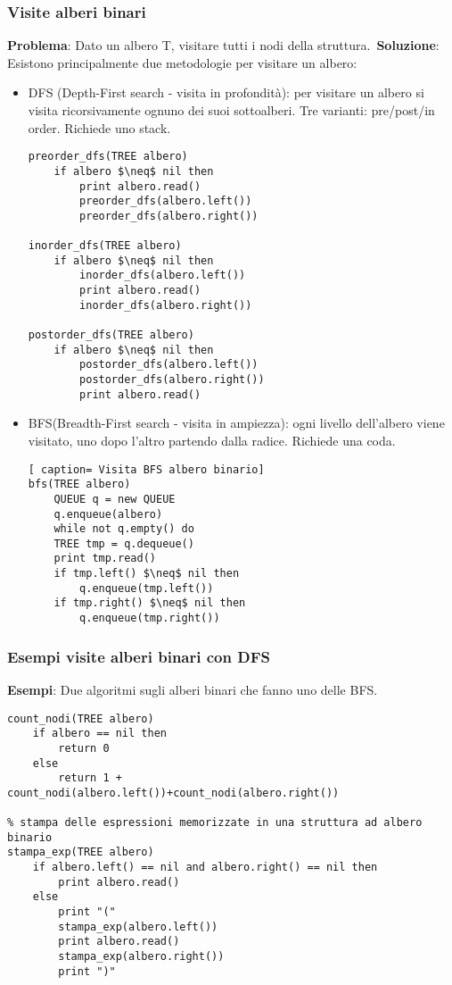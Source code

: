 \documentclass[../cheatSheetAlgoritmi.tex]{subfiles}
\begin{document}
\subsubsection{Visite alberi binari}
\textbf{Problema}: Dato un albero T, visitare tutti i nodi della struttura.\
\textbf{Soluzione}: Esistono principalmente due metodologie per visitare un albero:\
\begin{itemize}
	\item DFS (Depth-First search - visita in profondità): per visitare un albero si visita ricorsivamente ognuno dei suoi sottoalberi. Tre varianti: pre/post/in order. Richiede uno stack.
\begin{lstlisting}[caption= Visita DFS albero binario]
preorder_dfs(TREE albero)
	if albero $\neq$ nil then
		print albero.read()
		preorder_dfs(albero.left())
		preorder_dfs(albero.right())

inorder_dfs(TREE albero)
	if albero $\neq$ nil then
		inorder_dfs(albero.left())
		print albero.read()
		inorder_dfs(albero.right())

postorder_dfs(TREE albero)
	if albero $\neq$ nil then
		postorder_dfs(albero.left())
		postorder_dfs(albero.right())
		print albero.read()
\end{lstlisting}
 	\item BFS(Breadth-First search - visita in ampiezza): ogni livello dell'albero viene visitato, uno dopo l'altro partendo dalla radice. Richiede una coda. 
\begin{lstlisting}[ caption= Visita BFS albero binario]
bfs(TREE albero)
	QUEUE q = new QUEUE
	q.enqueue(albero)
	while not q.empty() do
	TREE tmp = q.dequeue()
	print tmp.read()
	if tmp.left() $\neq$ nil then
		q.enqueue(tmp.left())
	if tmp.right() $\neq$ nil then
		q.enqueue(tmp.right())
\end{lstlisting}
\end{itemize}
\newpage

\subsubsection{Esempi visite alberi binari con DFS}
\textbf{Esempi}: Due algoritmi sugli alberi binari che fanno uno delle BFS.
\begin{lstlisting}[caption= Esempi DFS alberi binari]
% conta i nodi di un albero binario
count_nodi(TREE albero)
	if albero == nil then
		return 0
	else 
		return 1 + count_nodi(albero.left())+count_nodi(albero.right())

% stampa delle espressioni memorizzate in una struttura ad albero binario
stampa_exp(TREE albero)
	if albero.left() == nil and albero.right() == nil then
		print albero.read()
	else 
		print "("
		stampa_exp(albero.left())
		print albero.read()
		stampa_exp(albero.right())
		print ")"
\end{lstlisting}
\end{document}
